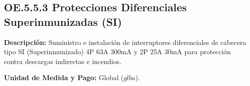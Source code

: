 \subsection{OE.5.5.3 Protecciones Diferenciales Superinmunizadas (SI)}
\textbf{Descripción:} Suministro e instalación de interruptores diferenciales de cabecera tipo SI (Superinmunizado) 4P 63A 300mA y 2P 25A 30mA para protección contra descargas indirectas e incendios.

\textbf{Unidad de Medida y Pago:} Global ($glba$).
